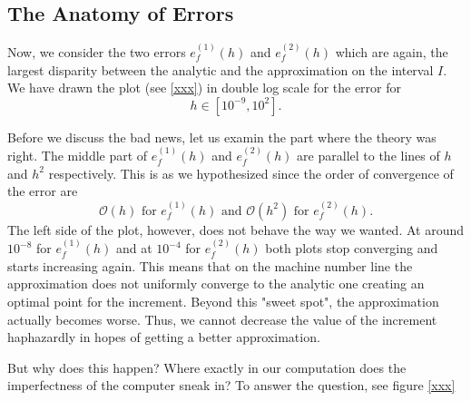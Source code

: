 \subsection{The Anatomy of Errors}

Now, we consider the two errors \(e_f^{(1)}(h)\) and \(e_f^{(2)}(h)\) which are again, the largest disparity between the analytic and the approximation on the interval \(I\). We have drawn the plot (see \ref{xxx}) in double log scale for the error for
\[h \in [10^{-9}, 10^2] \text{.} \]


Before we discuss the bad news, let us examin the part where the theory was right. The middle part of \(e_f^{(1)}(h)\) and \(e_f^{(2)}(h)\) are parallel to the lines of \(h\) and \(h^2\) respectively. This is as we hypothesized since the order of convergence of the error are
\[\mathcal{O}(h) \text{ for } e_f^{(1)}(h) \text{ and } \mathcal{O}(h^2) \text{ for } e_f^{(2)}(h) \text{.}\]
The left side of the plot, however, does not behave the way we wanted. At around \(10^{-8}\) for \(e_f^{(1)}(h)\) and at \(10^{-4}\) for \(e_f^{(2)}(h)\) both plots stop converging and starts increasing again. This means that on the machine number line the approximation does not uniformly converge to the analytic one creating an optimal point for the increment. Beyond this "sweet spot", the approximation actually becomes worse. Thus, we cannot decrease the value of the increment haphazardly in hopes of getting a better approximation.

But why does this happen? Where exactly in our computation does the imperfectness of the computer sneak in? To answer the question, see figure \ref{xxx}


